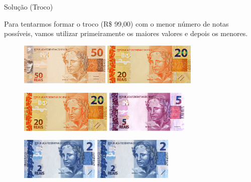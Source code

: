 \documentclass{beamer}
\begin{document}
\begin{frame}{Solução (Troco)}
\begin{itemize}
Para tentarmos formar o troco (R\$ 99,00) com o menor número de notas possíveis, vamos utilizar primeiramente os maiores valores e depois os menores. 
\end{itemize}

\pause

\begin{figure}[tb]
\begin{center}
	\includegraphics[height=2cm]{50.jpg} \pause \quad
	\includegraphics[height=2cm]{20.jpg}
\end{center}
\end{figure}

\pause

\begin{figure}[tb]
\begin{center}
	\includegraphics[height=2cm]{20.jpg} \pause \quad
	\includegraphics[height=2cm]{5.jpg}
\end{center}
\end{figure}

\pause

\begin{figure}[tb]
\begin{center}
	\includegraphics[height=2cm]{2.jpg} \pause \quad
	\includegraphics[height=2cm]{2.jpg}
\end{center}
\end{figure}





\end{frame}
\end{document}

